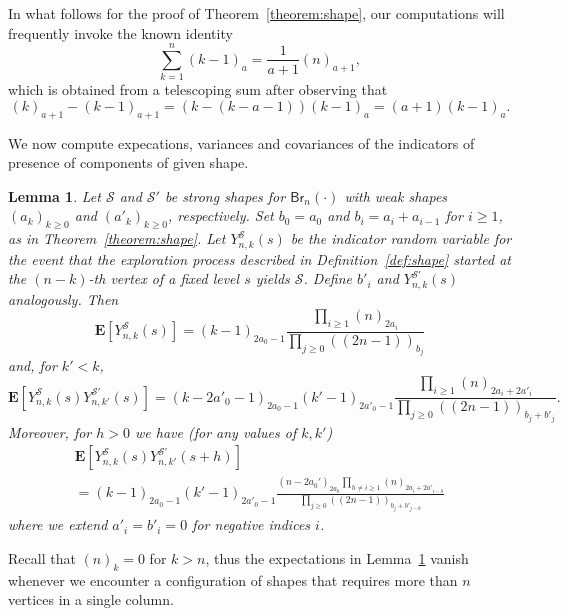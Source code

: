 \documentclass[a4paper,11pt,reqno]{amsart}
\newcommand{\bE}{\mathbf{E}}
\newcommand{\Br}{\mathsf{Br}}
\newcommand{\shape}{\mathscr{S}}
\newcommand{\fdf}[1]{(\!(#1)\!)}
\newtheorem{lemma}{Lemma}
\theoremstyle{definition}
\begin{document}
In what follows for the proof of Theorem~\ref{theorem:shape}, our computations will frequently invoke the known identity
\begin{equation}\label{eq:disccalc}
 \sum_{k=1}^n (k-1)_a = \frac{1}{a+1}(n)_{a+1},
\end{equation}
which is obtained from a telescoping sum after observing that 
\[
 (k)_{a+1}-(k-1)_{a+1} = (k-(k-a-1))(k-1)_a = (a+1)(k-1)_a.
\]

We now compute expecations, variances and covariances of the indicators of presence of components of given shape. 

\begin{lemma}\label{lemma:EYn}
 Let $\shape$ and $\shape'$ be strong shapes for $\Br_n(\cdot)$ with weak shapes $(a_k)_{k\geq0}$ and $(a'_k)_{k\geq0}$, respectively. Set $b_0=a_0$ and $b_i=a_i+a_{i-1}$ for $i\geq1$, as in Theorem~\ref{theorem:shape}. Let $Y_{n,k}^\shape(s)$ be the indicator random variable for the event that the exploration process described in Definition~\ref{def:shape} started at the $(n-k)$-th vertex of a fixed level $s$ yields $\shape$. Define $b'_i$ and $Y_{n,k}^{\shape'}(s)$ analogously. Then 
 \begin{equation}\label{eq:Ynkshape}
  \bE\left[Y_{n,k}^\shape(s)\right]=(k-1)_{2a_0-1} \frac{\prod_{i\geq 1} (n)_{2a_i}}{\prod_{j\geq 0} \fdf{2n-1}_{b_j}}
 \end{equation}
 and, for $k'<k$,
 \begin{equation}\label{eq:Ynkshapes1}
  \bE\left[Y_{n,k}^\shape(s)Y_{n,k'}^{\shape'}(s)\right] = (k-2a'_0-1)_{2a_0-1}(k'-1)_{2a'_0-1} \frac{\prod_{i\geq 1} (n)_{2a_i+2a'_i}}{\prod_{j\geq 0} \fdf{2n-1}_{b_j+b'_j} }.
 \end{equation}
 Moreover, for $h>0$ we have (for any values of $k,k'$)
 \begin{multline}\label{eq:Ynkshapes2}
  \bE\left[Y_{n,k}^\shape(s)Y_{n,k'}^{\shape'}(s+h)\right]\\
  = (k-1)_{2a_0-1}(k'-1)_{2a'_0-1} \frac{(n-2a_0')_{2a_h}\prod_{h\neq i\geq 1} (n)_{2a_i+2a'_{i-h}}}{\prod_{j\geq 0} \fdf{2n-1}_{b_j+b'_{j-h}} }
 \end{multline}
 where we extend $a'_i=b'_i=0$ for negative indices $i$. 
\end{lemma}

Recall that $(n)_k=0$ for $k>n$, thus the expectations in Lemma~\ref{lemma:EYn} vanish whenever we encounter a configuration of shapes that requires more than $n$ vertices in a single column. 
\end{document}
